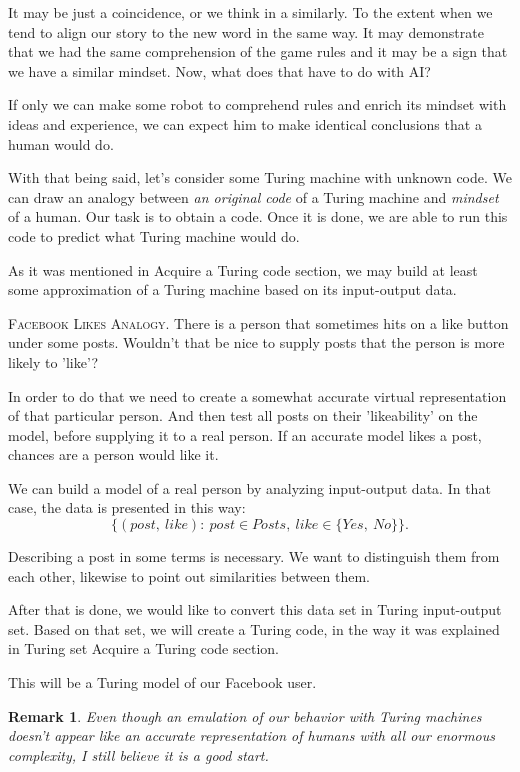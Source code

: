 \documentclass{beamer}
\newtheorem*{remark}{Remark}
\begin{document}
\begin{frame}
It may be just a coincidence, or we think in a similarly. To the extent when we tend to align our story to the new word in the same way. It may demonstrate that we had the same comprehension of the game rules and it may be a sign that we have a similar mindset. Now, what does that have to do with AI?

If only we can make some robot to comprehend rules and enrich its mindset with ideas and experience, we can expect him to make identical conclusions that a human would do.

With that being said, let's consider some Turing machine with unknown code. We can draw an analogy between \emph{an original code} of a Turing machine and \emph{mindset} of a human. Our task is to obtain a code. Once it is done, we are able to run this code to predict what Turing machine would do.

As it was mentioned in \textsf{Acquire a Turing code
} section, we may build at least some approximation of a Turing machine based on its input-output data.
\end{frame}

\begin{frame}
\textsc{Facebook Likes Analogy.} There is a person that sometimes hits on a like button under some posts. Wouldn't that be nice to supply posts that the person is more likely to 'like'?

In order to do that we need to create a somewhat accurate virtual representation of that particular person. And then test all posts on their 'likeability' on the model, before supplying it to a real person. If an accurate model likes a post, chances are a person would like it.

We can build a model of a real person by analyzing input-output data. In that case, the data is presented in this way: $$\{(post,\ like):\ post\in Posts,\ like\in\{Yes,\ No\}\}.$$

Describing a post in some terms is necessary. We want to distinguish them from each other, likewise to point out similarities between them.
\end{frame}

\begin{frame}
After that is done, we would like to convert this data set in Turing input-output set. Based on that set, we will create a Turing code, in the way it was explained in Turing set \textsf{Acquire a Turing code
} section.

This will be a Turing model of our Facebook user. 

\begin{remark}
Even though an emulation of our behavior with Turing machines doesn't appear like an accurate representation of humans with all our enormous complexity, I still believe it is a good start.
\end{remark}

\end{frame}
\end{document}
